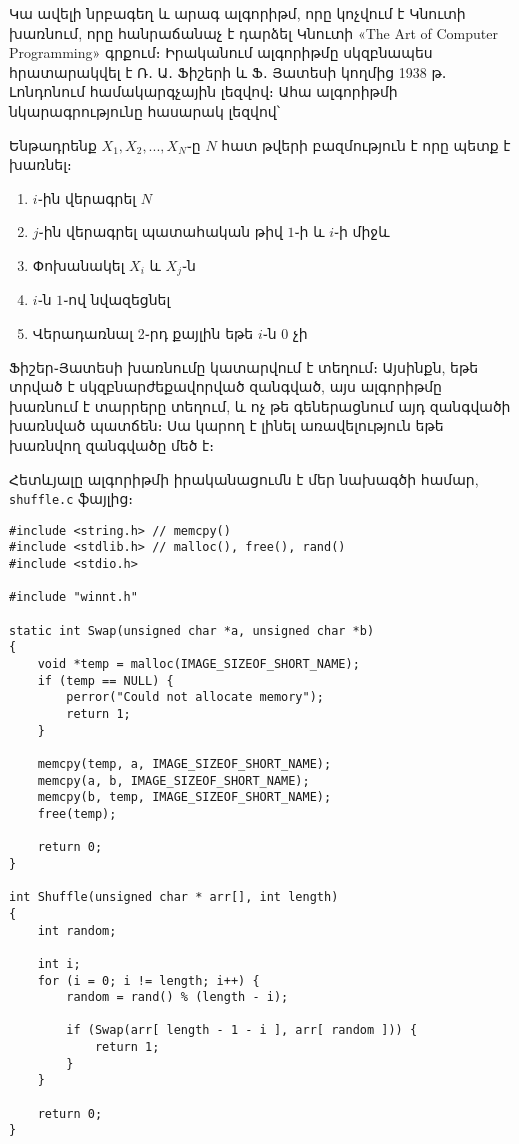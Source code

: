 \documentclass[12pt]{article}
\begin{document}
\begin{sloppypar}
Կա ավելի նրբագեղ և արագ ալգորիթմ, որը կոչվում է Կնուտի խառնում, որը հանրաճանաչ
է դարձել Կնուտի «The Art of Computer Programming» գրքում։ Իրականում ալգորիթմը
սկզբնապես հրատարակվել է Ռ․ Ա․ Ֆիշերի և Ֆ․ Յատեսի կողմից 1938 թ․ Լոնդոնում
համակարգչային լեզվով։ Ահա ալգորիթմի նկարագրությունը հասարակ լեզվով՝

Ենթադրենք $X_{1}, X_{2}, ..., X_{N}$֊ը $N$ հատ թվերի բազմություն է որը պետք է
խառնել։

\begin{enumerate}
\item $i$֊ին վերագրել $N$
\item $j$֊ին վերագրել պատահական թիվ $1$֊ի և $i$֊ի միջև
\item Փոխանակել $X_i$ և $X_j$֊ն
\item $i$֊ն $1$֊ով նվազեցնել
\item Վերադառնալ 2֊րդ քայլին եթե $i$֊ն $0$ չի
\end{enumerate}

Ֆիշեր֊Յատեսի խառնումը կատարվում է տեղում։ Այսինքն, եթե տրված է
սկզբնարժեքավորված զանգված, այս ալգորիթմը խառնում է տարրերը տեղում, և ոչ թե
գեներացնում այդ զանգվածի խառնված պատճեն։ Սա կարող է լինել առավելություն եթե
խառնվող զանգվածը մեծ է։

Հետևյալը ալգորիթմի իրականացումն է մեր նախագծի համար, \texttt{shuffle.c} ֆայլից։

\begin{lstlisting}
#include <string.h> // memcpy()
#include <stdlib.h> // malloc(), free(), rand()
#include <stdio.h>

#include "winnt.h"

static int Swap(unsigned char *a, unsigned char *b)
{
    void *temp = malloc(IMAGE_SIZEOF_SHORT_NAME);
    if (temp == NULL) {
        perror("Could not allocate memory");
        return 1;
    }

    memcpy(temp, a, IMAGE_SIZEOF_SHORT_NAME);
    memcpy(a, b, IMAGE_SIZEOF_SHORT_NAME);
    memcpy(b, temp, IMAGE_SIZEOF_SHORT_NAME);
    free(temp);

    return 0;
}

int Shuffle(unsigned char * arr[], int length)
{
    int random;

    int i;
    for (i = 0; i != length; i++) {
        random = rand() % (length - i);

        if (Swap(arr[ length - 1 - i ], arr[ random ])) {
            return 1;
        }
    }

    return 0;
}
\end{lstlisting}


\end{sloppypar}
\end{document}
